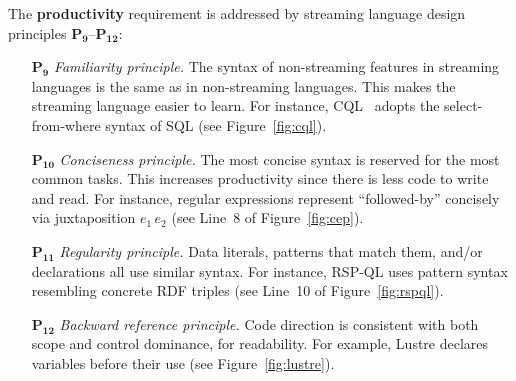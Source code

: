 The \textbf{productivity} requirement is addressed by streaming
language design principles $\mathbf{P_9}$--$\mathbf{P_{12}}$:
\begin{itemize}
  \item[$\mathbf{P_9}$] \emph{Familiarity principle.} The syntax of
    non-streaming features in streaming languages is the same as in
    non-streaming languages. This makes the streaming language easier
    to learn. For instance, CQL~\cite{arasu_widom_2004} adopts the
    select-from-where syntax of SQL (see Figure~\ref{fig:cql}).
  \item[$\mathbf{P_{10}}$] \emph{Conciseness principle.} The most concise
    syntax is reserved for the most common tasks. This increases
    productivity since there is less code to write and read. For
    instance, regular expressions represent ``followed-by'' concisely
    via juxtaposition \mbox{$e_1\,e_2$} (see Line~8 of
    Figure~\ref{fig:cep}).
  \item[$\mathbf{P_{11}}$] \emph{Regularity principle.} Data literals,
    patterns that match them, and/or declarations all use similar
    syntax. For instance, RSP-QL uses pattern syntax resembling
    concrete RDF triples (see Line~10 of Figure~\ref{fig:rspql}).
  \item[$\mathbf{P_{12}}$] \emph{Backward reference principle.} Code
    direction is consistent with both scope and control dominance, for
    readability. For example, Lustre declares variables before their
    use (see Figure~\ref{fig:lustre}).
\end{itemize}

